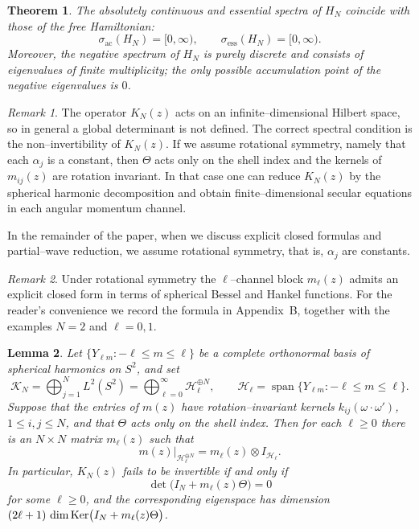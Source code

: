 \documentclass[a4paper,11pt]{article}
\numberwithin{equation}{section}
\renewcommand{\ker}{\text{\rm Ker}}
\newtheorem{thm}{Theorem}
\newtheorem{lem}[thm]{Lemma}
\theoremstyle{definition}
\theoremstyle{remark}
\newtheorem{rem}{Remark}
\begin{document}
\begin{thm}\label{thm:ac}
The absolutely continuous and essential spectra of $H_N$ coincide with those
of the free Hamiltonian:
$$
\sigma_{\mathrm{ac}}(H_N)=[0,\infty),\qquad
\sigma_{\mathrm{ess}}(H_N)=[0,\infty).
$$
Moreover, the negative spectrum of $H_N$ is purely discrete and consists of
eigenvalues of finite multiplicity; the only possible accumulation point of
the negative eigenvalues is $0$.
\end{thm}

\begin{rem}
The operator $K_N(z)$ acts on an infinite--dimensional Hilbert space, so in general
a global determinant is not defined.
The correct spectral condition is the non--invertibility of $K_N(z)$.
If we assume rotational symmetry, namely that each $\alpha_j$ is a constant, then
$\Theta$ acts only on the shell index and the kernels of $m_{ij}(z)$ are rotation
invariant.
In that case one can reduce $K_N(z)$ by the spherical harmonic decomposition and
obtain finite--dimensional secular equations in each angular momentum channel.
\end{rem}

In the remainder of the paper, when we discuss explicit closed formulas and
partial--wave reduction, we assume rotational symmetry, that is, $\alpha_j$ are
constants.

\begin{rem}\label{rem:ml-explicit}
Under rotational symmetry the $\ell$--channel block $m_\ell(z)$ admits an explicit
closed form in terms of spherical Bessel and Hankel functions.
For the reader's convenience we record the formula in Appendix~B, together with
the examples $N=2$ and $\ell=0,1$.
\end{rem}

\begin{lem}\label{lem:block-reduction}
Let $\{Y_{\ell m}:-\ell\le m\le\ell\}$ be a complete orthonormal basis of
spherical harmonics on $S^2$, and set
$$
 \mathcal K_N
 = \bigoplus_{j=1}^N L^2(S^2)
 = \bigoplus_{\ell=0}^\infty \mathcal H_\ell^{\oplus N},
 \qquad
 \mathcal H_\ell = \operatorname{span}\{Y_{\ell m}:-\ell\le m\le\ell\}.
$$
Suppose that the entries of $m(z)$ have rotation--invariant kernels
$k_{ij}(\omega\cdot\omega')$, $1\le i,j\le N$, and that $\Theta$ acts only on the
shell index.
Then for each $\ell\ge0$ there is an $N\times N$ matrix $m_\ell(z)$ such that
$$
 m(z)\big|_{\mathcal H_\ell^{\oplus N}}
 =
 m_\ell(z)\otimes I_{\mathcal H_\ell}.
$$
In particular, $K_N(z)$ fails to be invertible if and only if
$$
 \det\bigl(I_N + m_\ell(z)\Theta\bigr)=0
$$
for some $\ell\ge0$, and the corresponding eigenspace has dimension
$(2\ell+1)\,\dim\ker\bigl(I_N+m_\ell(z)\Theta\bigr)$.
\end{lem}
\end{document}
